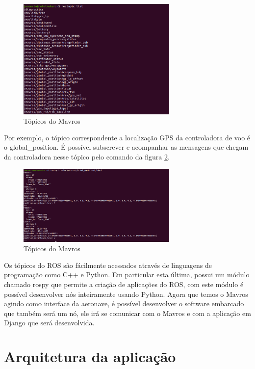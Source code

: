 \documentclass[12pt,a4paper,oneside]{book}
\begin{document}
%
\begin{figure}[H]
  \centering
  \includegraphics[width=0.7\textwidth]{Images/Desenvolvimento/mavros_rostopic_list.png}
  \caption{Tópicos do Mavros}
  \label{fig:mavros_rostopic_list.png.0}
\end{figure}
%
Por exemplo, o tópico correspondente a localização GPS da controladora de voo é o global\_position. É possível subscrever e acompanhar as mensagens que chegam da controladora nesse tópico pelo comando da figura \ref{fig:mavros_rostopic_echo.png.0}.
%
\begin{figure}[H]
  \centering
  \includegraphics[width=0.7\textwidth]{Images/Desenvolvimento/mavros_rostopic_echo.png}
  \caption{Tópicos do Mavros}
  \label{fig:mavros_rostopic_echo.png.0}
\end{figure}
%

Os tópicos do ROS são fácilmente acessados através de linguagens de programação como C++ e Python. Em particular esta última, possui um módulo chamado rospy que permite a criação de aplicações do ROS, com este módulo é possível desenvolver nós inteiramente usando Python. Agora que temos o Mavros agindo como interface da aeronave, é possível desenvolver o software embarcado que também será um nó, ele irá se comunicar com o Mavros e com a aplicação em Django que será desenvolvida.

\section{Arquitetura da aplicação}
\end{document}
